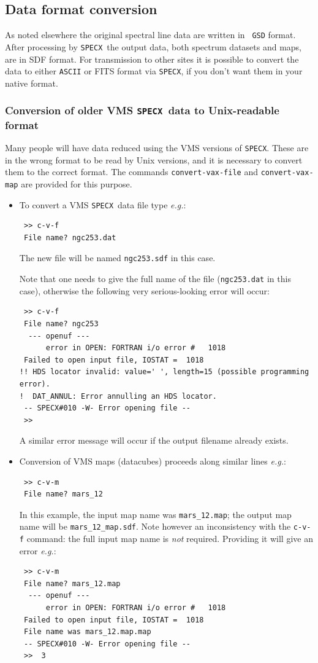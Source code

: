 \documentclass[11pt,twoside]{article}
\newcommand{\eg}{{\it e.g.}}
\newcommand{\SPECX}{{\tt SPECX}}
\begin{document}
\subsection{Data format conversion}
\label{sec:fits-etc}
As noted elsewhere the original spectral line data are written in {\tt
GSD} format. After processing by \SPECX\ the output data, both
spectrum datasets and maps, are in SDF format. For transmission to
other sites it is possible to convert the data to either {\tt ASCII}
or FITS format via
\SPECX , if you don't want them in your native format.

\subsubsection{Conversion of older VMS \SPECX\ data to Unix-readable
format}
\label{sec:cvf_cvm}
Many people will have data reduced using the VMS versions of
\SPECX . These are in the wrong format to be read by Unix versions,
and it is necessary to convert them to the correct format. The
commands {\tt convert-vax-file} and {\tt convert-vax-map} are provided
for this purpose.
\begin{itemize}
\item
To convert a VMS \SPECX\ data file type \eg :
\begin{verbatim}
 >> c-v-f
 File name? ngc253.dat
\end{verbatim}
The new file will be named {\tt ngc253.sdf} in this case.

Note that one needs to give the full name of the file ({\tt{ngc253.dat}}
in this case), otherwise the following very serious-looking error will
occur:

\begin{verbatim}
 >> c-v-f
 File name? ngc253
  --- openuf ---
      error in OPEN: FORTRAN i/o error #   1018
 Failed to open input file, IOSTAT =  1018
!! HDS locator invalid: value=' ', length=15 (possible programming error).
!  DAT_ANNUL: Error annulling an HDS locator.
 -- SPECX#010 -W- Error opening file --
 >>
\end{verbatim}
A similar error message will occur if the output filename already exists.
\item
Conversion of VMS maps (datacubes) proceeds along similar lines \eg :
\begin{verbatim}
 >> c-v-m
 File name? mars_12
\end{verbatim}

In this example, the input map name was {\tt mars\_12.map}; the output
map name will be {\tt mars\_12\_map.sdf}. Note however an inconsistency
with the {\tt c-v-f} command: the full input map name is {\it not}
required. Providing it will give an error \eg :

\begin{verbatim}
 >> c-v-m
 File name? mars_12.map
  --- openuf ---
      error in OPEN: FORTRAN i/o error #   1018
 Failed to open input file, IOSTAT =  1018
 File name was mars_12.map.map
 -- SPECX#010 -W- Error opening file --
 >>  3
\end{verbatim}
\end{itemize}
\end{document}
